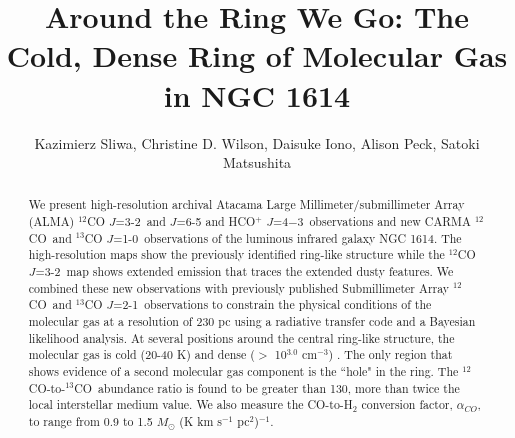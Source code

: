 \documentclass[preprint, 11pt]{aastex}
\newcommand{\tco}{$^{13}$CO}
\newcommand{\co}{$^{12}$CO}
\newcommand{\tcoone}{$^{13}$CO $J$=1-0}
\newcommand{\tcotwo}{$^{13}$CO $J$=2-1}
\newcommand{\cothree}{$^{12}$CO $J$=3-2}
\newcommand{\hcofour}{HCO$^+$ $J$=4$-$3}
\newcommand{\alphaco}{$M_{\odot}$ (K km s$^{-1}$ pc$^{2}$)$^{-1}$}
\begin{document}
\title{Around the Ring We Go: The Cold, Dense Ring of Molecular Gas in NGC 1614}
\author{Kazimierz Sliwa,  
	Christine D. Wilson,
            Daisuke Iono,
	 Alison Peck,
          Satoki Matsushita
}
 

\begin{abstract}
We present high-resolution archival Atacama Large Millimeter/submillimeter Array (ALMA) \cothree\ and $J$=6-5 and \hcofour\ observations and new CARMA \co\ and \tcoone\ observations of the luminous infrared galaxy NGC 1614. The high-resolution maps show the previously identified ring-like structure while the \cothree\ map shows extended emission that traces the extended dusty features. We combined these new observations with previously published Submillimeter Array \co\ and \tcotwo\ observations to constrain the physical conditions of the molecular gas at a resolution of 230 pc using a radiative transfer code and a Bayesian likelihood analysis. At several positions around the central ring-like structure, the molecular gas is cold (20-40 K) and dense ($>$ 10$^{3.0}$ cm$^{-3}$) . The only region that shows evidence of a second molecular gas component is the ``hole" in the ring. The \co-to-\tco\ abundance ratio is found to be greater than 130, more than twice the local interstellar medium value. We also measure the CO-to-H$_{2}$ conversion factor, $\alpha_{CO}$, to range from 0.9 to 1.5 \alphaco. 
\end{abstract}

\end{document}
